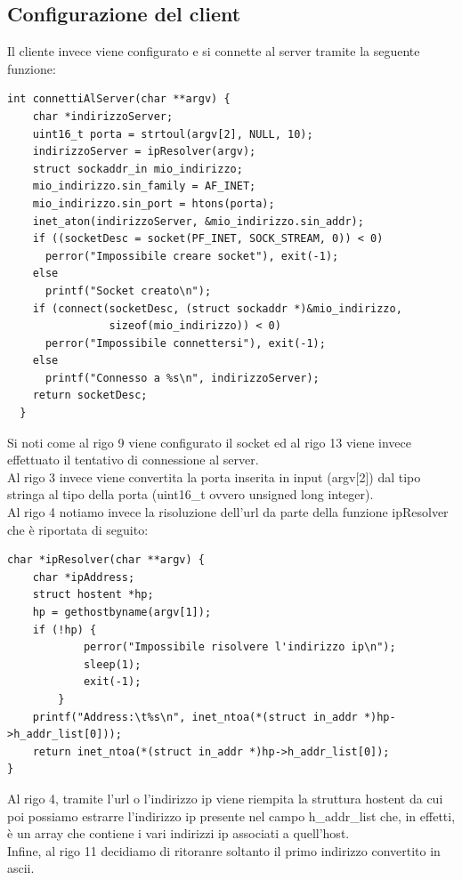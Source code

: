 \documentclass[a4paper]{article}
\begin{document}
\subsection{Configurazione del client}
Il cliente invece viene configurato e si connette al server tramite la seguente funzione:
\begin{lstlisting}
int connettiAlServer(char **argv) {
    char *indirizzoServer;
    uint16_t porta = strtoul(argv[2], NULL, 10);
    indirizzoServer = ipResolver(argv);
    struct sockaddr_in mio_indirizzo;
    mio_indirizzo.sin_family = AF_INET;
    mio_indirizzo.sin_port = htons(porta);
    inet_aton(indirizzoServer, &mio_indirizzo.sin_addr);
    if ((socketDesc = socket(PF_INET, SOCK_STREAM, 0)) < 0)
      perror("Impossibile creare socket"), exit(-1);
    else
      printf("Socket creato\n");
    if (connect(socketDesc, (struct sockaddr *)&mio_indirizzo,
                sizeof(mio_indirizzo)) < 0)
      perror("Impossibile connettersi"), exit(-1);
    else
      printf("Connesso a %s\n", indirizzoServer);
    return socketDesc;
  }
\end{lstlisting}
Si noti come al rigo 9 viene configurato il socket ed al rigo 13 viene invece effettuato il tentativo di connessione al server.\\
Al rigo 3 invece viene convertita la porta inserita in input (argv$[$2$]$) dal tipo stringa al tipo della porta (uint16\_t ovvero unsigned long integer).\\
Al rigo 4 notiamo invece la risoluzione dell'url da parte della funzione ipResolver che è riportata di seguito:
\begin{lstlisting}
char *ipResolver(char **argv) {
    char *ipAddress;
    struct hostent *hp;
    hp = gethostbyname(argv[1]);
    if (!hp) {
            perror("Impossibile risolvere l'indirizzo ip\n");
            sleep(1);
            exit(-1);
        }
    printf("Address:\t%s\n", inet_ntoa(*(struct in_addr *)hp->h_addr_list[0]));
    return inet_ntoa(*(struct in_addr *)hp->h_addr_list[0]);
}
\end{lstlisting}
Al rigo 4, tramite l'url o l'indirizzo ip viene riempita la struttura hostent da cui poi possiamo estrarre l'indirizzo ip presente nel campo 
h\_addr\_list  che, in effetti, è un array che contiene i vari indirizzi ip associati a quell'host.\\
Infine, al rigo 11 decidiamo di ritoranre soltanto il primo indirizzo convertito in ascii.
\end{document}
